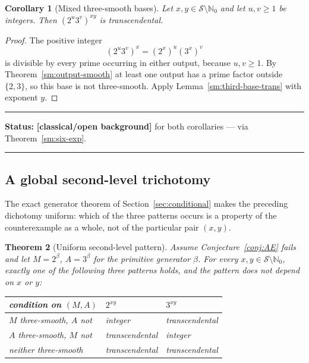 \documentclass[11pt,oneside]{article}
\newtheorem{theorem}{Theorem}[section]
\newtheorem{corollary}[theorem]{Corollary}
\theoremstyle{definition}
\theoremstyle{remark}
\newcommand{\Nzero}{\mathbb N_0}
\newcommand{\Sol}{\mathcal S}
\newcommand{\statusknown}{\textcolor{classicalgray}{\textbf{[classical/open background]}}}
\newenvironment{statusbox}[1]
{\begin{center}\begin{minipage}{0.94\textwidth}\raggedright\hbadness=10000\hrule
\vspace{0.45em}\textbf{Status:} #1\par\vspace{0.35em}}
{\vspace{0.35em}\hrule\end{minipage}\end{center}}
\begin{document}
\begin{corollary}[Mixed three-smooth bases]
\label{sm:mixed-base-trans}
Let $x,y\in\Sol\setminus\Nzero$ and let $u,v\ge1$ be integers.  Then $(2^u3^v)^{xy}$ is
transcendental.
\end{corollary}

\begin{proof}
The positive integer
\[
 (2^u3^v)^x=(2^x)^u(3^x)^v
\]
is divisible by every prime occurring in either output, because $u,v\ge1$.  By
Theorem~\ref{sm:output-smooth} at least one output has a prime factor outside $\{2,3\}$, so
this base is not three-smooth.  Apply Lemma~\ref{sm:third-base-trans} with exponent $y$.
\end{proof}

\begin{statusbox}{\statusknown{} for both corollaries --- via Theorem~\ref{sm:six-exp}.}
\end{statusbox}

\subsection{A global second-level trichotomy}

The exact generator theorem of Section~\ref{sec:conditional} makes the preceding dichotomy
uniform: which of the three patterns occurs is a property of the counterexample as a whole,
not of the particular pair $(x,y)$.

\begin{theorem}[Uniform second-level pattern]
\label{sm:uniform-second-level}
Assume Conjecture~\ref{conj:AE} fails and let $M=2^{\beta}$, $A=3^{\beta}$ for the primitive
generator $\beta$.  For every $x,y\in\Sol\setminus\Nzero$, exactly one of the following three
patterns holds, and the pattern does not depend on $x$ or $y$:
\begin{center}
\begin{tabular}{@{}p{}p{}p{}@{}}
\toprule
condition on $(M,A)$ & $2^{xy}$ & $3^{xy}$\\
\midrule
$M$ three-smooth, $A$ not & integer & transcendental\\
$A$ three-smooth, $M$ not & transcendental & integer\\
neither three-smooth & transcendental & transcendental\\
\bottomrule
\end{tabular}
\end{center}
\end{theorem}
\end{document}
